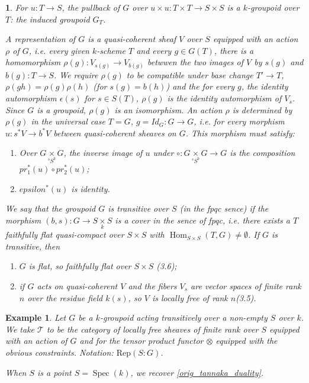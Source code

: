 \documentclass{article}
\newtheorem{env}[term]{}
\newtheorem{example}[term]{Example}
\DeclareMathOperator{\spec}{\text{Spec}}
\DeclareMathOperator{\Hom}{\text{Hom}}
\begin{document}
\begin{env}
  For $u:T \rightarrow S$, the pullback of $G$ over $u\times u: T \times T \rightarrow S \times S$ is a 
  $k$-groupoid over $T$: the induced groupoid $G_T$.

  A representation of $G$ is a quasi-coherent sheaf $V$ over $S$ equipped with an action $\rho$ of $G$, i.e. 
  every given $k$-scheme $T$ and every $g \in G(T)$, there is a homomorphism 
  $\rho (g): V_{s(g)} \rightarrow V_{b(g)}$ betwwen the two images of $V$ by $s(g)$ and $b(g):T \rightarrow S$. 
  We require $\rho(g)$ to be compatible under base change $T' \rightarrow T$, $\rho(gh) = \rho(g)\rho(h)$ 
  (for $s(g) = b(h)$) and the for every $g$, the identity automorphism $\epsilon(s)$ for $s \in S(T)$, $\rho(g)$ 
  is the identity automorphism of $V_s$. Since $G$ is a groupoid, $\rho(g)$ is an isomorphism. An action $\rho$ 
  is determined by $\rho(g)$ in the universal case $T=G$, $g = Id_G: G \rightarrow G$, i.e. for every morphism 
  $u:s^*V \rightarrow b^*V$ between quasi-coherent sheaves on $G$. This morphism must satisfy:
  \begin{enumerate}
    \item   Over $G \underset {^sS^b} \times G$, the inverse image of $u$ under 
            $\circ:G \underset {^sS^b} \times G \rightarrow G$ is the composition $pr_1^*(u)\circ pr_2^*(u)$;

    \item   $epsilon^*(u)$ is identity.
  \end{enumerate}
  
  We say that the groupoid $G$ is transitive over $S$ (in the fpqc sence) if the morphism 
  $(b,s):G \rightarrow S \underset k \times S$ is a cover in the sence of fpqc, i.e. there exists a $T$ 
  faithfully flat quasi-compact over $S \times S$ with $\Hom _{S \times S} (T,G) \neq \emptyset$. If $G$ is transitive,
  then 
  \begin{enumerate}
    \item $G$ is flat, so faithfully flat over $S \times S$ (3.6);
    \item if $G$ acts on quasi-coherent $V$ and the fibers $V_s$ are vector spaces of finite rank $n$ over the 
      residue field $k(s)$, so $V$ is locally free of rank $n$(3.5).
  \end{enumerate}

\end{env}

\begin{example}
  Let $G$ be a $k$-groupoid acting transitively over a non-empty $S$ over $k$. We take $\mathcal T$ to be the 
  category of locally free sheaves of finite rank over $S$ equipped with an action of $G$ and for the 
  tensor product functor $\otimes$ equipped with the obvious constraints. 
  Notation: $\text{Rep}(S:G)$.
  
  When $S$ is a point $S = \spec (k)$, we recover \ref{orig_tannaka_duality}.
\end{example}
\end{document}
